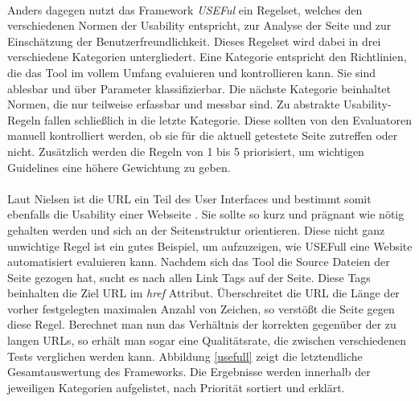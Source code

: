 \\
Anders dagegen nutzt das Framework \textit{USEFul} ein Regelset, welches den verschiedenen Normen der Usability entspricht, zur Analyse der Seite und zur Einschätzung der Benutzerfreundlichkeit. Dieses Regelset wird dabei in drei verschiedene Kategorien untergliedert. Eine Kategorie entspricht den Richtlinien, die das Tool im vollem Umfang evaluieren und kontrollieren kann. Sie sind ablesbar und über Parameter klassifizierbar. Die nächste Kategorie beinhaltet Normen, die nur teilweise erfassbar und messbar sind. Zu abstrakte Usability-Regeln fallen schließlich in die letzte Kategorie. Diese sollten von den Evaluatoren manuell kontrolliert werden, ob sie für die aktuell getestete Seite zutreffen oder nicht. Zusätzlich werden die Regeln von 1 bis 5 priorisiert, um wichtigen Guidelines eine höhere Gewichtung zu geben.\\
\\
Laut Nielsen ist die URL ein Teil des User Interfaces und bestimmt somit ebenfalls die Usability einer Webseite \cite{urlasui}. Sie sollte so kurz und prägnant wie nötig gehalten werden und sich an der Seitenstruktur orientieren. Diese nicht ganz unwichtige Regel ist ein gutes Beispiel, um aufzuzeigen, wie USEFull eine Website automatisiert evaluieren kann. Nachdem sich das Tool die Source Dateien der Seite gezogen hat, sucht es nach allen Link Tags auf der Seite. Diese Tags beinhalten die Ziel URL im \textit{href} Attribut. Überschreitet die URL die Länge der vorher festgelegten maximalen Anzahl von Zeichen, so verstößt die Seite gegen diese Regel. Berechnet man nun das Verhältnis der korrekten gegenüber der zu langen URLs, so erhält man sogar eine Qualitätsrate, die zwischen verschiedenen Tests verglichen werden kann. Abbildung \ref{usefull} zeigt die letztendliche Gesamtauswertung des Frameworks. Die Ergebnisse werden innerhalb der jeweiligen Kategorien aufgelistet, nach Priorität sortiert und erklärt.

